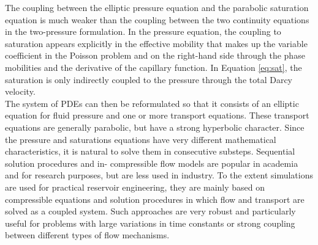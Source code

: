 \documentclass[12pt]{article}
\begin{document}
The coupling between the elliptic pressure equation and the parabolic saturation equation is much weaker than the coupling between the two continuity
equations in the two-pressure formulation. In the pressure equation,
the coupling to saturation appears explicitly in the effective mobility that makes up the variable coefficient in the Poisson problem and on the
right-hand side through the phase mobilities and the derivative of the capillary function. In Equation \eqref{eq:sat}, the saturation is only indirectly
coupled to the pressure through the total Darcy velocity. \\
The system of PDEs can then be reformulated so that
it consists of an elliptic equation for fluid pressure and one or more transport equations. These transport equations are generally parabolic, but have a
strong hyperbolic character. Since the pressure and saturations equations have very different mathematical characteristics, it is natural
to solve them in consecutive substeps. Sequential solution procedures and in-
compressible flow models are popular in academia and for research purposes,
but are less used in industry. To the extent simulations are used for practical reservoir engineering, they are mainly based on compressible equations
and solution procedures in which flow and transport are solved as a coupled
system. Such approaches are very robust and particularly useful for problems
with large variations in time constants or strong coupling between different
types of flow mechanisms. \\\\\\
\end{document}
